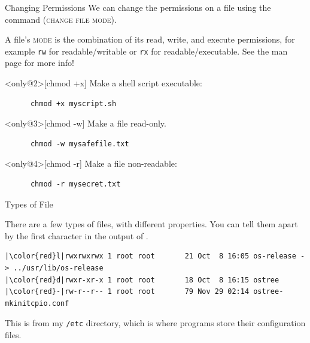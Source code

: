 \begin{frame}[fragile]{Changing Permissions}
  We can change the permissions on a file using the  command
  (\textsc{change file mode}).

   {
    A file's \textsc{mode} is the combination of its read, write, and execute
    permissions, for example \texttt{rw} for readable/writable or \texttt{rx}
    for readable/executable.  See the  man page for more info!
  }

  \pause

  \begin{example}<only@2>[chmod +x]
    Make a shell script executable:
    \begin{verbatim}
      chmod +x myscript.sh
    \end{verbatim}
  \end{example}

  \begin{example}<only@3>[chmod -w]
    Make a file read-only.
    \begin{verbatim}
      chmod -w mysafefile.txt
    \end{verbatim}
  \end{example}

  \begin{example}<only@4>[chmod -r]
    Make a file non-readable:
    \begin{verbatim}
      chmod -r mysecret.txt
    \end{verbatim}
  \end{example}
\end{frame}

\begin{frame}[fragile]{Types of File}

  There are a few types of files, with different properties.  You can tell them
  apart by the first character in the output of .

  \begin{verbatim}
|\color{red}l|rwxrwxrwx 1 root root       21 Oct  8 16:05 os-release -> ../usr/lib/os-release
|\color{red}d|rwxr-xr-x 1 root root       18 Oct  8 16:15 ostree
|\color{red}-|rw-r--r-- 1 root root       79 Nov 29 02:14 ostree-mkinitcpio.conf
  \end{verbatim}

  This is from my \texttt{/etc} directory, which is where programs store their
  configuration files.

\end{frame}

